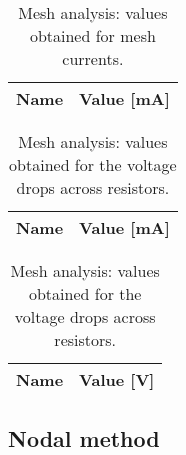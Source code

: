 \begin{table}[h]
  \centering
  \begin{tabular}{|l|r|}
    \hline
    {\bf Name} & {\bf Value [mA]} \\ \hline
    
  \end{tabular}
  \caption{Mesh analysis: values obtained for mesh currents.}
  \label{tab:op1}
\end{table}

\begin{table}[h]
  \parbox{.45\linewidth}{
    \centering
    \begin{tabular}{|c|c|}
      \hline
      {\bf Name} & {\bf Value [mA]} \\ \hline
      
    \end{tabular}
    \caption{Mesh analysis: values obtained for the currents running through the resistors.}
  }
  \hfill
  \parbox{.45\linewidth}{
    \centering
    \begin{tabular}{|c|c|}
      \hline
      {\bf Name} & {\bf Value [V]} \\ \hline
      
    \end{tabular}
    \caption{Mesh analysis: values obtained for the voltage drops across resistors.}
  }
\end{table}

\subsection{Nodal method}

